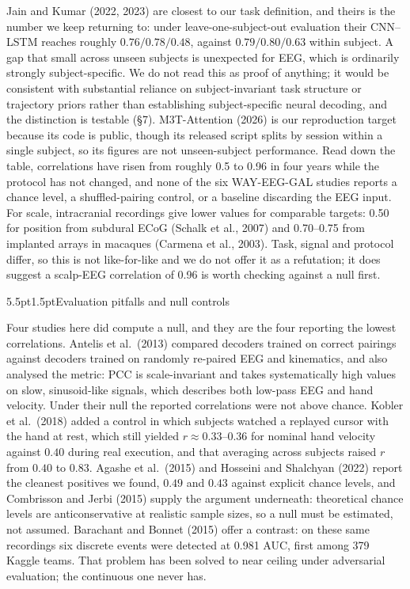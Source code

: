 \documentclass[11pt]{article}
\makeatletter
\renewcommand\section{\@startsection{section}{1}{\z@}%
  {5.5pt\@plus2pt\@minus2pt}{1.5pt}{\normalfont\large\bfseries}}
\makeatother
\begin{document}
Jain and Kumar (2022, 2023) are closest to our task definition, and theirs is the number we keep returning to: under leave-one-subject-out evaluation their CNN--LSTM reaches roughly $0.76/0.78/0.48$, against $0.79/0.80/0.63$ within subject. A gap that small across unseen subjects is unexpected for EEG, which is ordinarily strongly subject-specific. We do not read this as proof of anything; it would be consistent with substantial reliance on subject-invariant task structure or trajectory priors rather than establishing subject-specific neural decoding, and the distinction is testable (\S7). M3T-Attention (2026) is our reproduction target because its code is public, though its released script splits by session within a single subject, so its figures are not unseen-subject performance. Read down the table, correlations have risen from roughly 0.5 to 0.96 in four years while the protocol has not changed, and none of the six WAY-EEG-GAL studies reports a chance level, a shuffled-pairing control, or a baseline discarding the EEG input. For scale, intracranial recordings give lower values for comparable targets: 0.50 for position from subdural ECoG (Schalk et al., 2007) and 0.70--0.75 from implanted arrays in macaques (Carmena et al., 2003). Task, signal and protocol differ, so this is not like-for-like and we do not offer it as a refutation; it does suggest a scalp-EEG correlation of 0.96 is worth checking against a null first.

\section{Evaluation pitfalls and null controls}

Four studies here did compute a null, and they are the four reporting the lowest correlations. Antelis et al.~(2013) compared decoders trained on correct pairings against decoders trained on randomly re-paired EEG and kinematics, and also analysed the metric: PCC is scale-invariant and takes systematically high values on slow, sinusoid-like signals, which describes both low-pass EEG and hand velocity. Under their null the reported correlations were not above chance. Kobler et al.~(2018) added a control in which subjects watched a replayed cursor with the hand at rest, which still yielded $r\approx0.33$--$0.36$ for nominal hand velocity against $0.40$ during real execution, and that averaging across subjects raised $r$ from $0.40$ to $0.83$. Agashe et al.~(2015) and Hosseini and Shalchyan (2022) report the cleanest positives we found, $0.49$ and $0.43$ against explicit chance levels, and Combrisson and Jerbi (2015) supply the argument underneath: theoretical chance levels are anticonservative at realistic sample sizes, so a null must be estimated, not assumed. Barachant and Bonnet (2015) offer a contrast: on these same recordings six discrete events were detected at 0.981 AUC, first among 379 Kaggle teams. That problem has been solved to near ceiling under adversarial evaluation; the continuous one never has.
\end{document}

